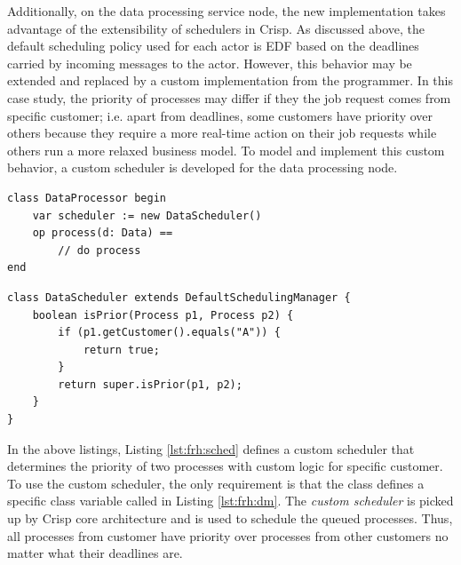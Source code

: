 Additionally, on the data processing service node, the new implementation takes advantage of the extensibility of schedulers in Crisp.
As discussed above, the default scheduling policy used for each actor is EDF based on the deadlines carried by incoming messages to the actor.
However, this behavior may be extended and replaced by a custom implementation from the programmer.
In this case study, the priority of processes may differ if they the job request comes from specific customer; i.e.
apart from deadlines, some customers have priority over others because they require a more real-time action on their job requests while others run a more relaxed business model.
To model and implement this custom behavior, a custom scheduler is developed for the data processing node.
\begin{center}
\begin{minipage}[t]{0.48\textwidth}
\vspace{-30pt}
\begin{lstlisting}[label=lst:frh:dm, caption=Data Processor class]
class DataProcessor begin
	var scheduler := new DataScheduler()
	op process(d: Data) ==
		// do process
end
\end{lstlisting}
\end{minipage}
\hfill
\begin{minipage}[t]{0.48\textwidth}
\vspace{-30pt}
\begin{lstlisting}[label=lst:frh:sched, caption=Custom scheduler]
class DataScheduler extends DefaultSchedulingManager {
	boolean isPrior(Process p1, Process p2) {
		if (p1.getCustomer().equals("A")) {
			return true;
		}
		return super.isPrior(p1, p2);
	}
}
\end{lstlisting}
\end{minipage}
\vspace{-15pt}
\end{center}
In the above listings, Listing \ref{lst:frh:sched} defines a custom scheduler that determines the priority of two processes with custom logic for specific customer.
To use the custom scheduler, the only requirement is that the class  defines a specific class variable called  in Listing \ref{lst:frh:dm}.
The \textsl{custom scheduler} is picked up by Crisp core architecture and is used to schedule the queued processes.
Thus, all processes from customer  have priority over processes from other customers no matter what their deadlines are.

